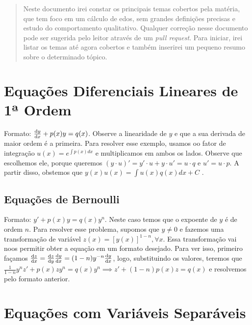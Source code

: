 \documentclass[12pt]{article}
\begin{document}
\maketitle

\begin{abstract}
    Neste documento irei constar os principais temas cobertos pela matéria,
    que tem foco em um cálculo de edos, sem grandes definições precisas e
    estudo do comportamento qualitativo. Qualquer correção nesse documento
    pode ser sugerida pelo leitor através de um \textit{pull request}. Para
    iniciar, irei listar os temas até agora cobertos e também inserirei um
    pequeno resumo sobre o determinado tópico.
\end{abstract}

\tableofcontents

\section{Equações Diferenciais Lineares de 1ª Ordem}

Formato: $\dv{y}{x} + p(x)y = q(x)$. Observe a linearidade de $y$ e que a sua
derivada de maior ordem é a primeira. Para resolver esse exemplo, usamos oo
fator de integração $u(x) = e^{\int p(x) dx}$ e multiplicamos em ambos os
lados. Observe que escolhemos ele, porque queremos $(y\cdot u)' = y'\cdot u +
y\cdot u' = u\cdot q$ e $u' = u\cdot p$. A partir disso, obstemos que
$y(x)u(x) = \int u(x)q(x) dx + C$ . 

\subsection{Equações de Bernoulli}

Formato: $y' + p(x)y = q(x)y^n$. Neste caso temos que o expoente de $y$ é de
ordem $n$. Para resolver esse problema, supomos que $y \neq 0$ e fazemos uma
transformação de variável $z(x) = [y(x)]^{1-n}, \forall x$. Essa transformação
vai noos permitir obter a equação em um formato desejado. Para ver isso,
primeiro façamos $\dv{z}{x} = \dv{z}{y}\dv{y}{x} =
(1-n)y^{-n}\dv{y}{x}$, logo, substituindo os valores, teremos que
$\frac{1}{1-n}y^{n}z' + p(x)zy^n = q(x)y^n \implies z' + (1-n)p(x)z = q(x)$ e
resolvemos pelo formato anterior. 

\section{Equações com Variáveis Separáveis}
\end{document}
